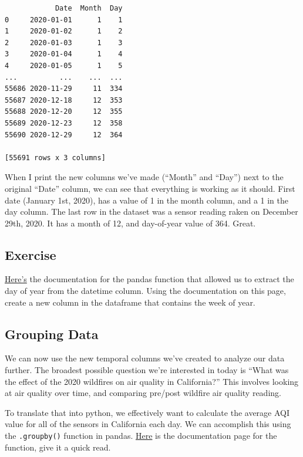 \documentclass[
  letterpaper,
  DIV=11,
  numbers=noendperiod]{scrreprt}
\begin{document}
\begin{verbatim}
            Date  Month  Day
0     2020-01-01      1    1
1     2020-01-02      1    2
2     2020-01-03      1    3
3     2020-01-04      1    4
4     2020-01-05      1    5
...          ...    ...  ...
55686 2020-11-29     11  334
55687 2020-12-18     12  353
55688 2020-12-20     12  355
55689 2020-12-23     12  358
55690 2020-12-29     12  364

[55691 rows x 3 columns]
\end{verbatim}

When I print the new columns we've made (``Month'' and ``Day'') next to
the original ``Date'' column, we can see that everything is working as
it should. First date (January 1st, 2020), has a value of 1 in the month
column, and a 1 in the day column. The last row in the dataset was a
sensor reading raken on December 29th, 2020. It has a month of 12, and
day-of-year value of 364. Great.

\hypertarget{exercise-3}{%
\subsection{Exercise}\label{exercise-3}}

\href{https://pandas.pydata.org/docs/reference/api/pandas.Series.dt.dayofyear.html}{Here's}
the documentation for the pandas function that allowed us to extract the
day of year from the datetime column. Using the documentation on this
page, create a new column in the dataframe that contains the week of
year.

\hypertarget{grouping-data}{%
\subsection{Grouping Data}\label{grouping-data}}

We can now use the new temporal columns we've created to analyze our
data further. The broadest possible question we're interested in today
is ``What was the effect of the 2020 wildfires on air quality in
California?'' This involves looking at air quality over time, and
comparing pre/post wildfire air quality reading.

To translate that into python, we effectively want to calculate the
average AQI value for all of the sensors in California each day. We can
accomplish this using the \texttt{.groupby()} function in pandas.
\href{https://pandas.pydata.org/docs/reference/api/pandas.DataFrame.groupby.html}{Here}
is the documentation page for the function, give it a quick read.
\end{document}
